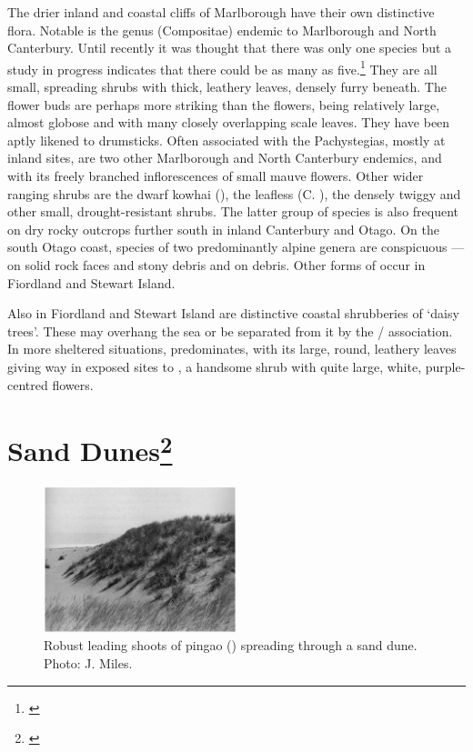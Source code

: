 The drier inland and coastal cliffs of Marlborough have their own distinctive flora.
Notable is the genus  (Compositae) endemic to Marlborough and North Canterbury.
Until recently it was thought that there was only one species but a study in progress indicates that there could be as many as five.\footnote{\cite{molloy1980taxonomy}}
They are all small, spreading shrubs with thick, leathery leaves, densely furry beneath.
The flower buds are perhaps more striking than the flowers, being relatively large, almost globose and with many closely overlapping scale leaves.
They have been aptly likened to drumsticks.
Often associated with the Pachystegias, mostly at inland sites, are two other Marlborough and North Canterbury endemics,  and  with its freely branched inflorescences of small mauve flowers.
Other wider ranging shrubs are the dwarf kowhai (), the leafless  (C. ), the densely twiggy  and other small, drought-resistant shrubs.
The latter group of species is also frequent on dry rocky outcrops further south in inland Canterbury and Otago.
On the south Otago coast, species of two predominantly alpine genera are conspicuous —  on solid rock faces and stony debris and  on debris.
Other forms of  occur in Fiordland and Stewart Island.

Also in Fiordland and Stewart Island are distinctive coastal shrubberies of `daisy trees'.
These may overhang the sea or be separated from it by the  /  association.
In more sheltered situations,  predominates, with its large, round, leathery leaves giving way in exposed sites to , a handsome shrub with quite large, white, purple-centred flowers.

\section[Sand Dunes]{Sand Dunes\footnote{\cite{moore1963plants}}}

\begin{figure}
	\includegraphics[width=0.5\textwidth]{graphics/figure88pingao.jpg}
	\centering
	\caption[Robust leading shoots of pingao]{Robust leading shoots of pingao () spreading through a sand dune.
	Photo: J. Miles.}
	\label{fig:88pingao}
\end{figure}

